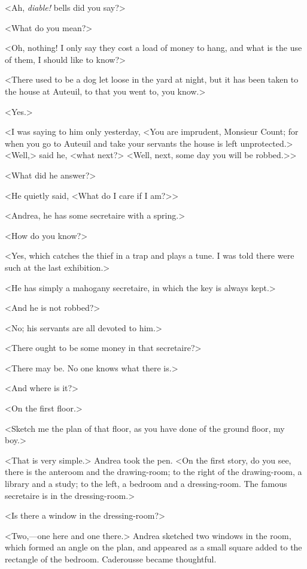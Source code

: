  <Ah, \textit{diable!} bells did you say?> 

 <What do you mean?> 

 <Oh, nothing! I only say they cost a load of money to hang, and what is the use of them, I should like to know?> 

 <There used to be a dog let loose in the yard at night, but it has been taken to the house at Auteuil, to that you went to, you know.> 

 <Yes.> 

 <I was saying to him only yesterday, <You are imprudent, Monsieur Count; for when you go to Auteuil and take your servants the house is left unprotected.> <Well,> said he, <what next?> <Well, next, some day you will be robbed.>> 

 <What did he answer?> 

 <He quietly said, <What do I care if I am?>> 

 <Andrea, he has some secretaire with a spring.> 

 <How do you know?> 

 <Yes, which catches the thief in a trap and plays a tune. I was told there were such at the last exhibition.> 

 <He has simply a mahogany secretaire, in which the key is always kept.> 

 <And he is not robbed?> 

 <No; his servants are all devoted to him.> 

 <There ought to be some money in that secretaire?> 

 <There may be. No one knows what there is.> 

 <And where is it?> 

 <On the first floor.> 

 <Sketch me the plan of that floor, as you have done of the ground floor, my boy.> 

 <That is very simple.> Andrea took the pen. <On the first story, do you see, there is the anteroom and the drawing-room; to the right of the drawing-room, a library and a study; to the left, a bedroom and a dressing-room. The famous secretaire is in the dressing-room.> 

 <Is there a window in the dressing-room?> 

 <Two,—one here and one there.> Andrea sketched two windows in the room, which formed an angle on the plan, and appeared as a small square added to the rectangle of the bedroom. Caderousse became thoughtful. 

